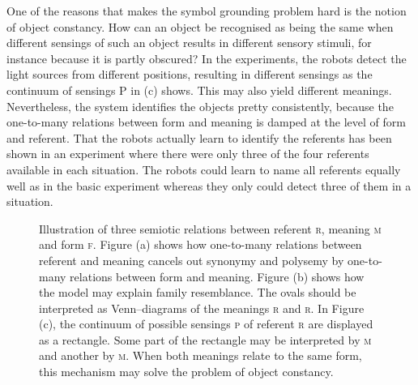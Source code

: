 One of the reasons that makes the symbol grounding problem hard is the notion of object constancy. How can an object be recognised as being the same when different sensings of such an object results in different sensory stimuli, for instance because it is partly obscured? In the experiments, the robots detect the light sources from different positions, resulting in different sensings as the continuum of sensings P in  (c) shows. This may also yield different meanings. Nevertheless, the system identifies the objects pretty consistently, because the one-to-many relations between form and meaning is damped at the level of form and referent. That the robots actually learn to identify the referents has been shown in an experiment where there were only three of the four referents available in each situation. The robots could learn to name all referents equally well as in the basic experiment whereas they only could detect three of them in a situation.


\begin{figure}
	\centering
	\caption{Illustration of three semiotic relations between referent \textsc{r}, meaning \textsc{m} and form \textsc{f}. Figure (a) shows how one-to-many relations between referent and meaning cancels out synonymy and polysemy by one-to-many relations between form and meaning. Figure (b) shows how the model may explain family resemblance. The ovals should be interpreted as Venn--diagrams of the meanings \textsc{r} and \textsc{r}. In Figure (c), the continuum of possible sensings \textsc{p} of referent \textsc{r} are displayed as a rectangle. Some part of the rectangle may be interpreted by \textsc{m} and another by \textsc{m}. When both meanings relate to the same form, this mechanism may solve the problem of object constancy.}
	\label{f:disc:semiotic1}
\end{figure}

